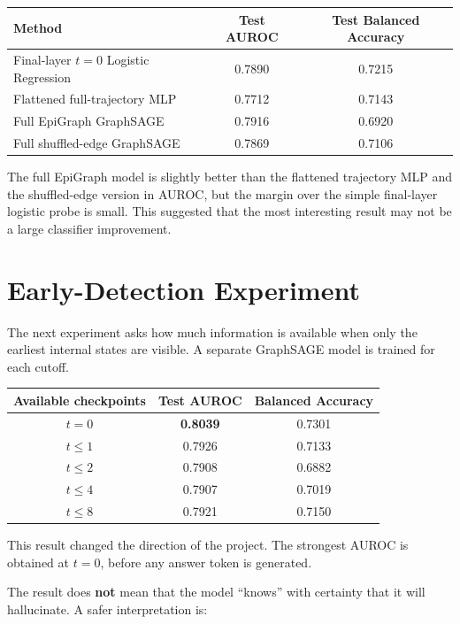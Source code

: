 \documentclass[11pt]{article}
\begin{document}
\begin{center}
\begin{tabular}{lcc}
\toprule
Method & Test AUROC & Test Balanced Accuracy \\
\midrule
Final-layer \(t=0\) Logistic Regression & 0.7890 & 0.7215 \\
Flattened full-trajectory MLP & 0.7712 & 0.7143 \\
Full EpiGraph GraphSAGE & 0.7916 & 0.6920 \\
Full shuffled-edge GraphSAGE & 0.7869 & 0.7106 \\
\bottomrule
\end{tabular}
\end{center}

The full EpiGraph model is slightly better than the flattened trajectory MLP and the shuffled-edge version in AUROC, but the margin over the simple final-layer logistic probe is small. This suggested that the most interesting result may not be a large classifier improvement.

\section{Early-Detection Experiment}

The next experiment asks how much information is available when only the earliest internal states are visible. A separate GraphSAGE model is trained for each cutoff.

\begin{center}
\begin{tabular}{ccc}
\toprule
Available checkpoints & Test AUROC & Balanced Accuracy \\
\midrule
\(t=0\) & \textbf{0.8039} & 0.7301 \\
\(t\leq1\) & 0.7926 & 0.7133 \\
\(t\leq2\) & 0.7908 & 0.6882 \\
\(t\leq4\) & 0.7907 & 0.7019 \\
\(t\leq8\) & 0.7921 & 0.7150 \\
\bottomrule
\end{tabular}
\end{center}

This result changed the direction of the project. The strongest AUROC is obtained at \(t=0\), before any answer token is generated.

The result does \textbf{not} mean that the model ``knows'' with certainty that it will hallucinate. A safer interpretation is:
\end{document}
